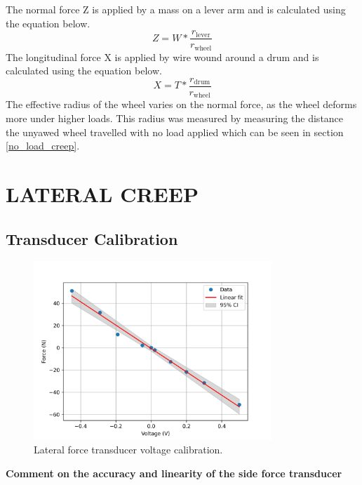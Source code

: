 \documentclass{article}
\begin{document}
The normal force Z is applied by a mass on a lever arm and is calculated using the equation below.
\begin{equation}
    Z = W * \frac{r_{\text{lever}}}{r_{\text{wheel}}}
\end{equation}
The longitudinal force X is applied by wire wound around a drum and is calculated using the equation below.
\begin{equation}
    X = T * \frac{r_{\text{drum}}}{r_{\text{wheel}}}
\end{equation}
The effective radius of the wheel varies on the normal force, as the wheel deforms more under higher loads.
This radius was measured by measuring the distance the unyawed wheel travelled with no load applied which can be seen in section \ref{no_load_creep}.

\section{LATERAL CREEP}

\subsection{\textbf{Transducer Calibration}}

\begin{figure}[H]
    \centering
    \includegraphics[width=0.8\textwidth]{Calibration/linearity.png}
    \caption{Lateral force transducer voltage calibration.}
    \label{fig:force_linearity}
\end{figure}

\begin{center}
    \textbf{Comment on the accuracy and linearity of the side force transducer}
\end{center}
\end{document}
